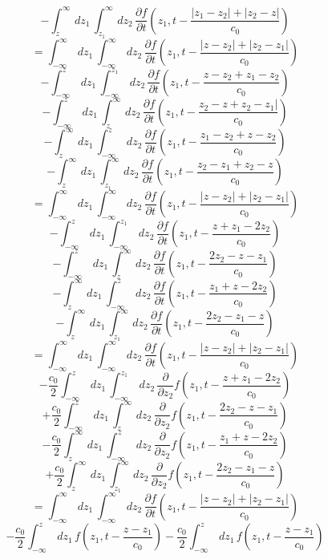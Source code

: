  \[
   - \int^{\infty}_z \,dz_1\,\int_{z_1}^{\infty}\,dz_2\,\frac{\partial
     f}{\partial t}\left(z_1,t-\frac{|z_1-z_2| + |z_2-z|}{c_0}\right)
 \]
\[
   =\int_{-\infty}^{\infty} \,dz_1\,\int_{-\infty}^{\infty} \,dz_2\, \frac{\partial f}{\partial
     t}\left(z_1,t-\frac{|z-z_2|+|z_2-z_1|}{c_0}\right)
 \]
 \[
   -\int_{-\infty}^z \,dz_1\,\int_{-\infty}^{z_1} \,dz_2\, \frac{\partial f}{\partial
     t}\left(z_1,t-\frac{z-z_2+z_1-z_2}{c_0}\right)
 \]
\[
   -\int_{-\infty}^z \,dz_1\,\int_{z}^{\infty} \,dz_2\, \frac{\partial f}{\partial
     t}\left(z_1,t-\frac{z_2-z+z_2-z_1|}{c_0}\right)
 \]
 \[
   - \int^{\infty}_z \,dz_1\,\int_{-\infty}^{z}\,dz_2\,\frac{\partial
     f}{\partial t}\left(z_1,t-\frac{z_1-z_2 + z-z_2}{c_0}\right)
 \]
 \[
   - \int^{\infty}_z \,dz_1\,\int_{z_1}^{\infty}\,dz_2\,\frac{\partial
     f}{\partial t}\left(z_1,t-\frac{z_2-z_1 + z_2-z}{c_0}\right)
 \]
\[
   =\int_{-\infty}^{\infty} \,dz_1\,\int_{-\infty}^{\infty} \,dz_2\, \frac{\partial f}{\partial
     t}\left(z_1,t-\frac{|z-z_2|+|z_2-z_1|}{c_0}\right)
 \]
 \[
   -\int_{-\infty}^z \,dz_1\,\int_{-\infty}^{z_1} \,dz_2\, \frac{\partial f}{\partial
     t}\left(z_1,t-\frac{z+z_1-2z_2}{c_0}\right)
 \]
\[
   -\int_{-\infty}^z \,dz_1\,\int_{z}^{\infty} \,dz_2\, \frac{\partial f}{\partial
     t}\left(z_1,t-\frac{2z_2-z-z_1}{c_0}\right)
 \]
 \[
   - \int^{\infty}_z \,dz_1\,\int_{-\infty}^{z}\,dz_2\,\frac{\partial
     f}{\partial t}\left(z_1,t-\frac{z_1+ z-2z_2}{c_0}\right)
 \]
 \[
   - \int^{\infty}_z \,dz_1\,\int_{z_1}^{\infty}\,dz_2\,\frac{\partial
     f}{\partial t}\left(z_1,t-\frac{2z_2-z_1-z}{c_0}\right)
 \]
\[
   =\int_{-\infty}^{\infty} \,dz_1\,\int_{-\infty}^{\infty} \,dz_2\, \frac{\partial f}{\partial
     t}\left(z_1,t-\frac{|z-z_2|+|z_2-z_1|}{c_0}\right)
 \]
 \[
   -\frac{c_0}{2}\int_{-\infty}^z \,dz_1\,\int_{-\infty}^{z_1} \,dz_2\, \frac{\partial }{\partial
     z_2}f\left(z_1,t-\frac{z+z_1-2z_2}{c_0}\right)
 \]
\[
   +\frac{c_0}{2}\int_{-\infty}^z \,dz_1\,\int_{z}^{\infty} \,dz_2\, \frac{\partial}{\partial
     z_2}f\left(z_1,t-\frac{2z_2-z-z_1}{c_0}\right)
 \]
 \[
   - \frac{c_0}{2}\int^{\infty}_z \,dz_1\,\int_{-\infty}^{z}\,dz_2\,\frac{\partial
     }{\partial z_2}f\left(z_1,t-\frac{z_1+ z-2z_2}{c_0}\right)
 \]
 \[
   +\frac{c_0}{2} \int^{\infty}_z \,dz_1\,\int_{z_1}^{\infty}\,dz_2\,\frac{\partial
     }{\partial z_2}f\left(z_1,t-\frac{2z_2-z_1-z}{c_0}\right)
 \]
\[
   =\int_{-\infty}^{\infty} \,dz_1\,\int_{-\infty}^{\infty} \,dz_2\, \frac{\partial f}{\partial
     t}\left(z_1,t-\frac{|z-z_2|+|z_2-z_1|}{c_0}\right)
 \]
 \[
   -\frac{c_0}{2}\int_{-\infty}^z \,dz_1\, f\left(z_1,t-\frac{z-z_1}{c_0}\right)
   -\frac{c_0}{2}\int_{-\infty}^z \,dz_1\,f\left(z_1,t-\frac{z-z_1}{c_0}\right)
 \]
